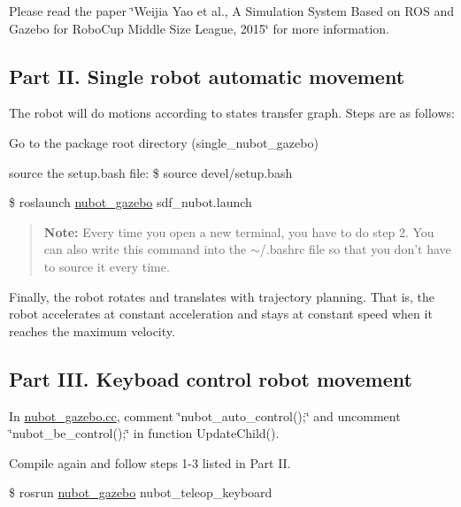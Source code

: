 Please read the paper \char`\"{}\-Weijia Yao et al., A Simulation System Based on R\-O\-S and Gazebo for Robo\-Cup Middle Size League, 2015\char`\"{} for more information.

\subsection*{Part I\-I. Single robot automatic movement}

The robot will do motions according to states transfer graph. Steps are as follows\-:
\begin{DoxyEnumerate}
\item Go to the package root directory (single\-\_\-nubot\-\_\-gazebo)
\item source the setup.\-bash file\-: {\ttfamily \$ source devel/setup.\-bash}
\item {\ttfamily \$ roslaunch \hyperlink{namespacenubot__gazebo}{nubot\-\_\-gazebo} sdf\-\_\-nubot.\-launch}
\end{DoxyEnumerate}

\begin{quotation}
{\bfseries Note\-:} Every time you open a new terminal, you have to do step 2. You can also write this command into the $\sim$/.bashrc file so that you don't have to source it every time.

\end{quotation}


Finally, the robot rotates and translates with trajectory planning. That is, the robot accelerates at constant acceleration and stays at constant speed when it reaches the maximum velocity.

\subsection*{Part I\-I\-I. Keyboad control robot movement}


\begin{DoxyEnumerate}
\item In \hyperlink{nubot__gazebo_8cc}{nubot\-\_\-gazebo.\-cc}, comment \char`\"{}nubot\-\_\-auto\-\_\-control();\char`\"{} and uncomment \char`\"{}nubot\-\_\-be\-\_\-control();\char`\"{} in function Update\-Child().
\item Compile again and follow steps 1-\/3 listed in Part I\-I.
\item {\ttfamily \$ rosrun \hyperlink{namespacenubot__gazebo}{nubot\-\_\-gazebo} nubot\-\_\-teleop\-\_\-keyboard}
\end{DoxyEnumerate}

